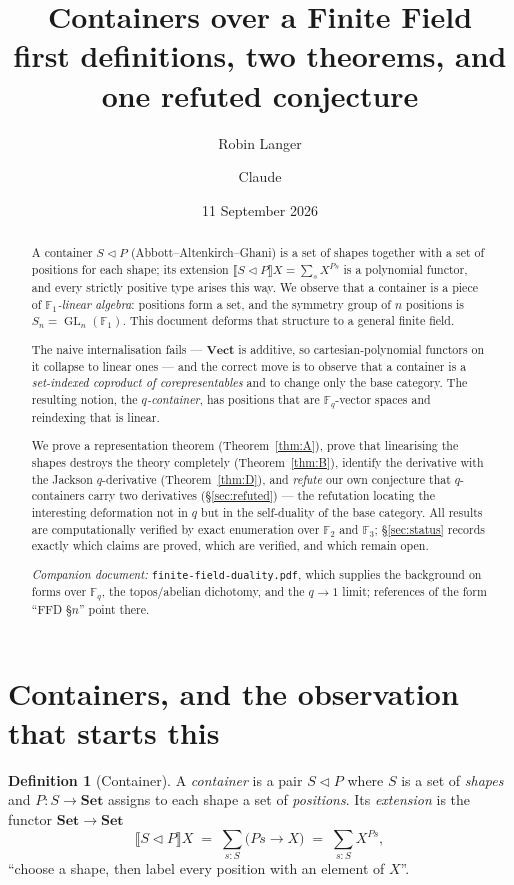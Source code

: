\documentclass[11pt,a4paper]{article}
\title{\bfseries Containers over a Finite Field\\[0.4em]
\large first definitions, two theorems, and one refuted conjecture}
\author{Robin Langer \and Claude}
\date{11 September 2026}
\theoremstyle{definition}
\newtheorem{definition}[theorem]{Definition}
\theoremstyle{remark}
\newcommand{\FF}{\mathbb{F}}
\newcommand{\cat}[1]{\mathbf{#1}}
\newcommand{\Set}{\cat{Set}}
\newcommand{\Vect}{\cat{Vect}}
\newcommand{\ext}[1]{\llbracket #1 \rrbracket}
\newcommand{\con}{\triangleleft}
\DeclareMathOperator{\GL}{GL}
\begin{document}
\maketitle

\begin{abstract}
A container $S \con P$ (Abbott--Altenkirch--Ghani) is a set of shapes together
with a set of positions for each shape; its extension
$\ext{S \con P}X = \sum_{s} X^{P s}$ is a polynomial functor, and every strictly
positive type arises this way. We observe that a container is a piece of
\emph{$\FF_1$-linear algebra}: positions form a set, and the symmetry group of $n$
positions is $S_n = \GL_n(\FF_1)$. This document deforms that structure to a
general finite field.

The naive internalisation fails --- $\Vect$ is additive, so cartesian-polynomial
functors on it collapse to linear ones --- and the correct move is to observe that
a container is a \emph{set-indexed coproduct of corepresentables} and to change
only the base category. The resulting notion, the \emph{$q$-container}, has
positions that are $\FF_q$-vector spaces and reindexing that is linear.

We prove a representation theorem (Theorem~\ref{thm:A}), prove that linearising
the shapes destroys the theory completely (Theorem~\ref{thm:B}), identify the
derivative with the Jackson $q$-derivative (Theorem~\ref{thm:D}), and
\emph{refute} our own conjecture that $q$-containers carry two derivatives
(\S\ref{sec:refuted}) --- the refutation locating the interesting deformation not
in $q$ but in the self-duality of the base category. All results are
computationally verified by exact enumeration over $\FF_2$ and $\FF_3$;
\S\ref{sec:status} records exactly which claims are proved, which are verified,
and which remain open.

\medskip
\noindent\emph{Companion document:} \texttt{finite-field-duality.pdf}, which
supplies the background on forms over $\FF_q$, the topos/abelian dichotomy, and
the $q \to 1$ limit; references of the form ``FFD \S$n$'' point there.
\end{abstract}

\tableofcontents

\section{Containers, and the observation that starts this}

\begin{definition}[Container]
A \emph{container} is a pair $S \con P$ where $S$ is a set of \emph{shapes} and
$P : S \to \Set$ assigns to each shape a set of \emph{positions}. Its
\emph{extension} is the functor $\Set \to \Set$
\[
  \ext{S \con P} X \;=\; \sum_{s : S} \bigl(P s \to X\bigr)
  \;=\; \sum_{s:S} X^{P s},
\]
``choose a shape, then label every position with an element of $X$''.
\end{definition}
\end{document}
